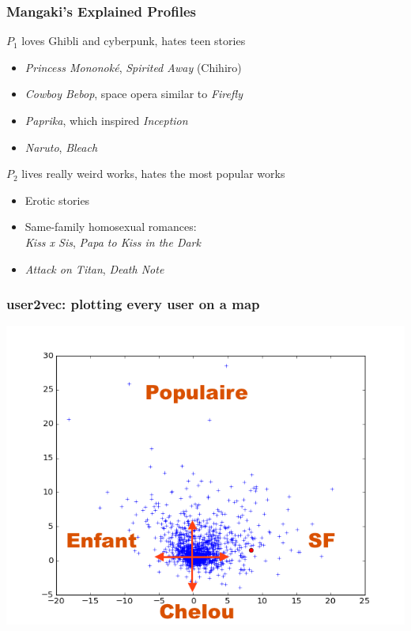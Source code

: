 \documentclass[handout]{beamer}
\begin{document}
\begin{frame}
    \frametitle{Mangaki's Explained Profiles}
    \begin{block}{$P_1$ loves Ghibli and cyberpunk, hates teen stories}
    \begin{itemize}
    \item[\good] \emph{Princess Mononoké}, \emph{Spirited Away} (Chihiro)
    \item[\good] \emph{Cowboy Bebop}, space opera similar to \emph{Firefly}
    \item[\good] \emph{Paprika}, which inspired \emph{Inception}
    \item[\bad] \emph{Naruto}, \emph{Bleach}
    \end{itemize}
    \end{block}
    \pause
    \begin{block}{$P_2$ lives really weird works, hates the most popular works}
    \begin{itemize}
    \item[\good] Erotic stories
    \item[\good] Same-family homosexual romances:\\\emph{Kiss x Sis}, \emph{Papa to Kiss in the Dark}
    \item[\bad] \emph{Attack on Titan}, \emph{Death Note}
    \end{itemize}
    \end{block}
\end{frame}

\begin{frame}
	\frametitle{user2vec: plotting every user on a map}
	\includegraphics[width=\linewidth]{figures/map.png}
\end{frame}
\end{document}
